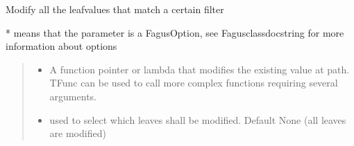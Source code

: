 \documentclass[a4paper,10pt,english]{sphinxmanual}
\begin{document}
\begin{fulllineitems}
\begin{fulllineitems}
\label{\detokenize{fagus:fagus.Fagus.mod_all}}
\pysigstartsignatures
{}
\pysigstopsignatures
\sphinxAtStartPar
Modify all the leaf\sphinxhyphen{}values that match a certain filter

\sphinxAtStartPar
* means that the parameter is a FagusOption, see Fagus\sphinxhyphen{}class\sphinxhyphen{}docstring for more information about options
\begin{quote}\begin{description}
\begin{itemize}
\item {}
\sphinxAtStartPar
{} \textendash{} A function pointer or lambda that modifies the existing value at path. TFunc can be used to
call more complex functions requiring several arguments.

\item {}
\sphinxAtStartPar
{} \textendash{} used to select which leaves shall be modified. Default None (all leaves are modified)


\end{itemize}
\end{description}
\end{quote}
\end{fulllineitems}
\end{fulllineitems}
\end{document}
